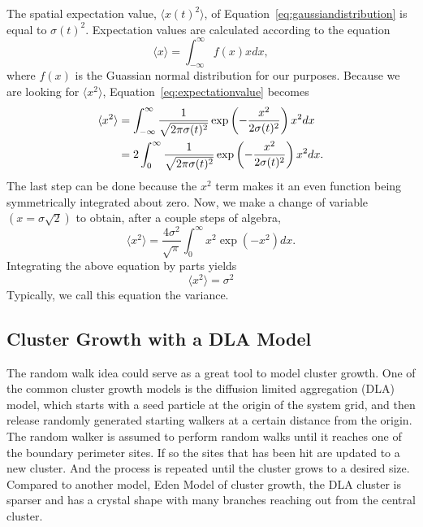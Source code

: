 \documentclass[12pt]{article}
\begin{document}
The spatial expectation value, $\langle x(t)^2\rangle$, of Equation~\ref{eq:gaussiandistribution} is equal to $\sigma(t)^2$. Expectation values are calculated according to the equation
\begin{equation}
  \label{eq:expectationvalue}
  \langle x\rangle = \int_{-\infty}^\infty f(x)xdx,
\end{equation}
where $f(x)$ is the Guassian normal distribution for our purposes. Because we are looking for $\langle x^2\rangle$, Equation~\ref{eq:expectationvalue} becomes
\begin{align}
  \label{eq:spatialexpectationvalueintegral}
  \langle x^2\rangle &= \int_{-\infty}^\infty \frac{1}{\sqrt{2\pi\sigma(t)^2}}\exp\left(-\frac{x^2}{2\sigma(t)^2}\right) x^2 dx \notag \\
  &= 2\int_{0}^\infty \frac{1}{\sqrt{2\pi\sigma(t)^2}}\exp\left(-\frac{x^2}{2\sigma(t)^2}\right) x^2 dx.
\end{align}
The last step can be done because the $x^2$ term makes it an even function being symmetrically integrated about zero. Now, we make a change of variable $(x=\sigma\sqrt{2})$ to obtain, after a couple steps of algebra,
\begin{equation}
  \label{eq:spatialexpectationvalue-simplified}
  \langle x^2\rangle = \frac{4\sigma^2}{\sqrt{\pi}}\int_0^\infty x^2 \exp(-x^2)dx.
\end{equation}
Integrating the above equation by parts yields
\begin{equation}
  \label{eq:variancesolved}
  \langle x^2 \rangle = \sigma^2
\end{equation}
Typically, we call this equation the variance. %

\subsection{Cluster Growth with a DLA Model}
\label{sec:clusterDLAmodel}

The random walk idea could serve as a great tool to model cluster growth. One of the common cluster growth models is the diffusion limited aggregation (DLA) model, which starts with a seed particle at the origin of the system grid, and then release randomly generated starting walkers at a certain distance from the origin. The random walker is assumed to perform random walks until it reaches one of the boundary perimeter sites.  If so the sites that has been hit are updated to a new cluster. And the process is repeated until the cluster grows to a desired size. Compared to another model, Eden Model of cluster growth, the DLA cluster is sparser and has a crystal shape with many branches reaching out from the central cluster.
\end{document}
